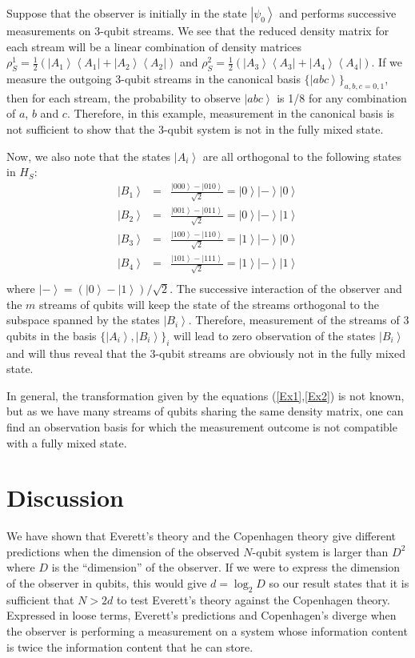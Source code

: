 \documentclass[11pt,amsmath,amssymb,latexsym,a4paper]{article}
\newcommand{\ket}[1]{\left|{#1}\right>}
\newcommand{\bra}[1]{\left<{#1}\right|}
\begin{document}
Suppose that the observer is initially in the state $\ket{\psi_0}$ and performs successive measurements on 3-qubit streams. We see that the reduced density matrix for each stream will be a linear combination of density matrices $\rho_S^1 = \frac{1}{2}\left(\ket{A_1}\bra{A_1}+\ket{A_2}\bra{A_2}\right)$ and $\rho_S^2 = \frac{1}{2}\left(\ket{A_3}\bra{A_3}+\ket{A_4}\bra{A_4}\right)$. If we measure the outgoing 3-qubit streams in the canonical basis $\{\ket{a b c}\}_{a, b, c = 0,1}$, then for each stream, the probability to observe $\ket{a b c}$ is 1/8 for any combination of $a$, $b$ and $c$. Therefore, in this example, measurement in the canonical basis is not sufficient to show that the 3-qubit system is not in the fully mixed state.

Now, we also note that the states $\ket{A_i}$ are all orthogonal to the following states in $H_S$:
\begin{eqnarray}
\ket{B_1} &=&\frac{\ket{000} - \ket{010}}{\sqrt{2}} = \ket{0}\ket{-}\ket{0}\\
\ket{B_2} &=&\frac{\ket{001} - \ket{011}}{\sqrt{2}} = \ket{0}\ket{-}\ket{1}\\
\ket{B_3} &=&\frac{\ket{100} - \ket{110}}{\sqrt{2}} = \ket{1}\ket{-}\ket{0}\\
\ket{B_4} &=&\frac{\ket{101} - \ket{111}}{\sqrt{2}} = \ket{1}\ket{-}\ket{1}\\
\end{eqnarray}
where $\ket{-}=(\ket{0}-\ket{1})/\sqrt{2}$. The successive interaction of the observer and the $m$ streams of qubits will keep the state of the streams orthogonal to the subspace spanned by the states $\ket{B_i}$. Therefore, measurement of the streams of 3 qubits in the basis $\{\ket{A_i},\ket{B_i}\}_i$ will lead to zero observation of the states $\ket{B_i}$ and will thus reveal that the 3-qubit streams are obviously not in the fully mixed state.

In general, the transformation given by the equations (\ref{Ex1},\ref{Ex2}) is not known, but as we have many streams of qubits sharing the same density matrix, one can find an observation basis for which the measurement outcome is not compatible with a fully mixed state.


\section{Discussion}
We have shown that Everett's theory and the Copenhagen theory give different predictions when the dimension of the observed $N$-qubit system is larger than $D^2$ where $D$ is the ``dimension'' of the observer. If we were to express the dimension of the observer in qubits, this would give $d=\log_2 D$ so our result states that it is sufficient that $N >  2 d$ to test Everett's theory against the Copenhagen theory. Expressed in loose terms, Everett's predictions and Copenhagen's diverge when the observer is performing a measurement on a system whose information content is twice the information content that he can store.
\end{document}
